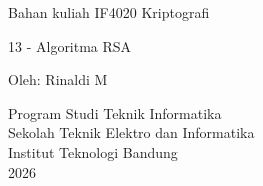\documentclass{article}
\begin{document}

\begin{center}
Bahan kuliah IF4020 Kriptografi

{\huge \color{red} 13 - Algoritma RSA}

\vspace{20mm}

Oleh: Rinaldi M

\vspace{10mm}

Program Studi Teknik Informatika\\
Sekolah Teknik Elektro dan Informatika\\
Institut Teknologi Bandung\\
2026
\end{center}
\end{document}
